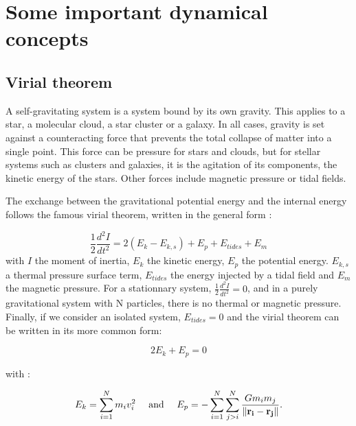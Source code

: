 %


\section{Some important dynamical concepts}


\subsection{Virial theorem}

A self-gravitating system is a system bound by its own gravity. This applies to a star, a molecular cloud, a star cluster or a galaxy. In all cases, gravity is set against a counteracting force that prevents the total collapse of matter into a single point. This force can be pressure for stars and clouds, but for stellar systems such as clusters and galaxies, it is the agitation of its components, the kinetic energy of the stars. Other forces include magnetic pressure or tidal fields.

The exchange between the gravitational potential energy and the internal energy follows the famous virial theorem, written in the general form \citep{McKee2007,BT}:

\begin{equation}
\frac{1}{2} \frac{d^2 I}{dt^2} = 2 ( E_k - E_{k,s}) +  E_p + E_{tides} + E_m
\end{equation}
with $I$ the moment of inertia, $E_k$ the kinetic energy, $E_p$ the potential energy. $E_{k,s}$  a thermal pressure surface term, $E_{tides}$ the energy injected by a tidal field and $E_m$ the magnetic pressure. For a stationnary system, $\frac{1}{2} \frac{d^2 I}{dt^2} = 0$, and in a purely gravitational system with N particles, there is no thermal or magnetic pressure. Finally, if we consider an isolated system, $E_{tides}=0$ and the virial theorem can be written in its more common form:

\begin{equation}
2 E_k + E_p = 0
\end{equation}

with :

\begin{equation}
 E_k = \sum_{i=1}^N m_i v_i^2 ~~~~\textrm{and}~~~~ E_p = - \sum_{i=1}^N \sum_{j>i}^N \frac{G m_i m_j}{\| \bold{r_i} - \bold{r_j}\| } .
\end{equation}

